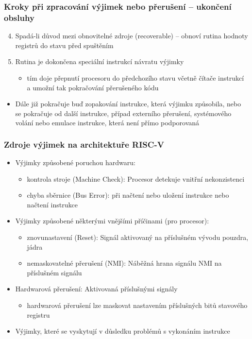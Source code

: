 \documentclass{beamer}
\begin{document}
\begin{frame}
\frametitle{Kroky při zpracování výjimek nebo přerušení -- ukončení obsluhy}

\begin{enumerate}
 \setcounter{enumi}{3}
 \item Spadá-li důvod mezi obnovitelné zdroje (recoverable) -- obnoví rutina hodnoty registrů do stavu před spuštěním
 \item Rutina je dokončena speciální instrukcí návratu výjimky
 \begin{itemize}
  \item tím doje přepnutí procesoru do předchozího stavu včetně čítače instrukcí a umožní tak pokračování
        přerušeného kódu
 \end{itemize}
\end{enumerate}
\begin{itemize}
 \item Dále již pokračuje buď zopakování instrukce, která výjimku způsobila, nebo se pokračuje od další instrukce,
       případ externího přerušení, systémového volání nebo emulace instrukce, která není přímo podporovaná
\end{itemize}
\end{frame}

\begin{frame}
\frametitle{Zdroje výjimek na architektuře RISC-V}

\begin{itemize}
 \item Výjimky způsobené poruchou hardwaru:
 \begin{itemize}
  \item kontrola stroje (Machine Check): Procesor detekuje vnitřní nekonzistenci
  \item chyba sběrnice (Bus Error): při načtení nebo uložení instrukce nebo načtení instrukce
 \end{itemize}
 \item Výjimky způsobené některými vnějšími příčinami (pro procesor):
 \begin{itemize}
  \item znovunastavení (Reset): Signál aktivovaný na příslušném vývodu pouzdra, jádra
  \item nemaskovatelné přerušení (NMI): Náběžná hrana signálu NMI na příslušném signálu
 \end{itemize}
 \item Hardwarová přerušení: Aktivovaná příslušnými signály
 \begin{itemize}
  \item hardwarová přerušení lze maskovat nastavením příslušných bitů stavového registru
 \end{itemize}
 \item Výjimky, které se vyskytují v důsledku problémů s vykonáním instrukce
\end{itemize}
\end{frame}
\end{document}
